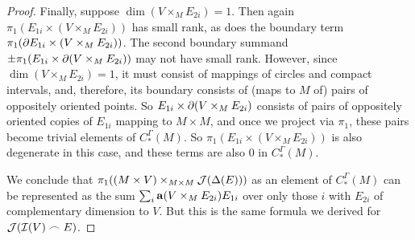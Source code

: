 \begin{proof}
Finally, suppose $\dim(V \times_M E_{2i}) = 1$. Then again $\pi_1(E_{1i} \times (V \times_M E_{2i}))$ has small rank, as does the boundary term $\pi_1(\partial E_{1i} \times (V \times_M E_{2i}))$. The second boundary summand $\pm\pi_1(E_{1i}\times\partial(V \times_M E_{2i}))$ may not have small rank. However, since $\dim(V \times_M E_{2i}) = 1$, it must consist of mappings of circles and compact intervals, and, therefore, its boundary consists of (maps to $M$ of) pairs of oppositely oriented points. So $E_{1i}\times\partial(V \times_M E_{2i})$ consists of pairs of oppositely oriented copies of $E_{1i}$ mapping to $M \times M$, and once we project via $\pi_1$, these pairs become trivial elements of $C^\Gamma_*(M)$. So $\pi_1(E_{1i} \times (V \times_M E_{2i}))$ is also degenerate in this case, and these terms are also $0$ in $C^\Gamma_*(M)$.

\begin{comment}

 We also have
$$\bd ( V \times_M E_{2i}) = \pm (\bd V) \times_M E_{2i}\pm V \times_M \bd E_{2i}$$.
Since $V$ is a cocycle, $\bd V$ is a union of trivial or small rank precochains, and hence so is $(\bd V) \times_M E_{2i}$ by Lemma \ref{L: pullback with Q}. If $\dim( V \times_M \bd E_{2i})>0$, then $\pi(V \times_M \bd E_{2i})$ has small rank. Finally, suppose $\dim (V \times_M \bd E_{2i}) = 0$. Then $\dim(V \times_M E_{2i}) = 1$. So $V \times_M E_{2i}$ consists of some number of circles and closed intervals in $E_{2i}$, and $V \times_M \bd E_{2i}$ will be the endpoints of those intervals. Since these must occur in pairs of opposite signs, then $E_{1i} \times (V \times_M \bd E_{2i})$ will consist of chains $\pm E_{1i} \times pt$, with the points being the points of $V \times_M \bd E_{2i}$. Since the points occur in oppositely signed pairs, under $\pi_1$ these pairs become trivial in $M$. Altogether then $\pi_1(\bd ( V \times_M E_{2i}))$ is a disjoint union of trivial and small rank precochains. So $V \times_M E_{2i} \in Q_*(M)$.
\end{comment}


We conclude that $\pi_1( (M \times V)\times_{M \times M}\mathcal{J}(\Delta(E)))$ as an element of $C_*^\Gamma(M)$ can be represented as the sum $\sum_i \mathbf{a}(V \times_M E_{2i})E_{1i}$ over only those $i$ with $E_{2i}$ of complementary dimension to $V$. But this is the same formula we derived for $\mathcal{J}(\mathcal{I}(V)\frown E)$.
\end{proof}






